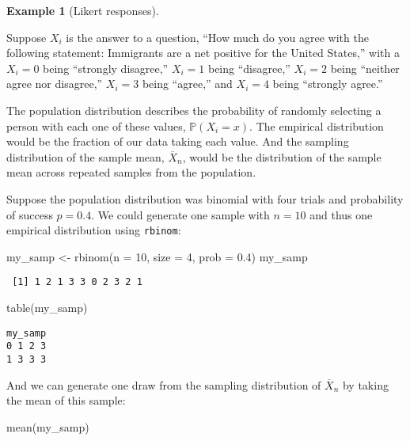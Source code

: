 \documentclass[
  letterpaper,
  DIV=11,
  numbers=noendperiod]{scrreprt}
\newenvironment{Shaded}{\begin{snugshade}}{\end{snugshade}}
\newcommand{\AttributeTok}[1]{\textcolor[rgb]{0.40,0.45,0.13}{#1}}
\newcommand{\DecValTok}[1]{\textcolor[rgb]{0.68,0.00,0.00}{#1}}
\newcommand{\FloatTok}[1]{\textcolor[rgb]{0.68,0.00,0.00}{#1}}
\newcommand{\FunctionTok}[1]{\textcolor[rgb]{0.28,0.35,0.67}{#1}}
\newcommand{\NormalTok}[1]{\textcolor[rgb]{0.00,0.23,0.31}{#1}}
\newcommand{\OtherTok}[1]{\textcolor[rgb]{0.00,0.23,0.31}{#1}}
\renewcommand{\P}{\mathbb{P}}
\newcommand{\Xbar}{\overline{X}}
\theoremstyle{definition}
\theoremstyle{plain}
\theoremstyle{definition}
\newtheorem{example}{Example}[chapter]
\theoremstyle{remark}
\begin{document}
\leavevmode{}%
\begin{example}[Likert responses]\label{exm-three-dist}

Suppose \(X_i\) is the answer to a question, ``How much do you agree
with the following statement: Immigrants are a net positive for the
United States,'' with a \(X_i = 0\) being ``strongly disagree,''
\(X_i = 1\) being ``disagree,'' \(X_i = 2\) being ``neither agree nor
disagree,'' \(X_i = 3\) being ``agree,'' and \(X_i = 4\) being
``strongly agree.''

The population distribution describes the probability of randomly
selecting a person with each one of these values, \(\P(X_i = x)\). The
empirical distribution would be the fraction of our data taking each
value. And the sampling distribution of the sample mean, \(\Xbar_n\),
would be the distribution of the sample mean across repeated samples
from the population.

Suppose the population distribution was binomial with four trials and
probability of success \(p = 0.4\). We could generate one sample with
\(n = 10\) and thus one empirical distribution using \texttt{rbinom}:

\begin{Shaded}
\begin{Highlighting}[]
\NormalTok{my\_samp }\OtherTok{\textless{}{-}} \FunctionTok{rbinom}\NormalTok{(}\AttributeTok{n =} \DecValTok{10}\NormalTok{, }\AttributeTok{size =} \DecValTok{4}\NormalTok{, }\AttributeTok{prob =} \FloatTok{0.4}\NormalTok{)}
\NormalTok{my\_samp}
\end{Highlighting}
\end{Shaded}

\begin{verbatim}
 [1] 1 2 1 3 3 0 2 3 2 1
\end{verbatim}

\begin{Shaded}
\begin{Highlighting}[]
\FunctionTok{table}\NormalTok{(my\_samp)}
\end{Highlighting}
\end{Shaded}

\begin{verbatim}
my_samp
0 1 2 3 
1 3 3 3 
\end{verbatim}

And we can generate one draw from the sampling distribution of
\(\Xbar_n\) by taking the mean of this sample:

\begin{Shaded}
\begin{Highlighting}[]
\FunctionTok{mean}\NormalTok{(my\_samp)}
\end{Highlighting}
\end{Shaded}


\end{example}
\end{document}
